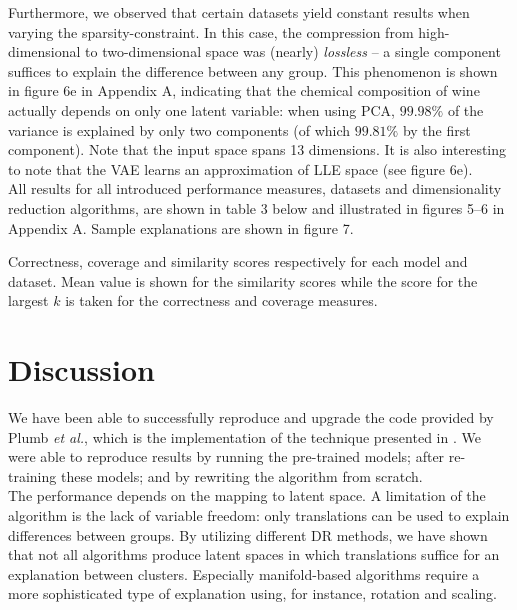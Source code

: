 Furthermore, we observed that certain datasets yield constant results when varying the sparsity-constraint. In this case, the compression from high-dimensional to two-dimensional space was (nearly) \textit{lossless} -- a single component suffices to explain the difference between any group. This phenomenon is shown in figure 6e in Appendix A, indicating that the chemical composition of wine actually depends on only one latent variable: when using PCA, $99.98\%$ of the variance is explained by only two components (of which $99.81\%$ by the first component). Note that the input space spans 13 dimensions. It is also interesting to note that the VAE learns an approximation of LLE space (see figure 6e).\\

All results for all introduced performance measures, datasets and dimensionality reduction algorithms, are shown in table 3 below and illustrated in figures 5--6 in Appendix A. Sample explanations are shown in figure 7.


\begin{table}[h]
  \begin{adjustwidth}{-3cm}{-3cm}
    \footnotesize
    \centering
    
  \end{adjustwidth}
  \caption{Correctness, coverage and similarity scores respectively for each model and dataset. Mean value is shown for the similarity scores while the score for the largest $k$ is taken for the correctness and coverage measures.}
\end{table}


\section{Discussion}
We have been able to successfully reproduce and upgrade the code provided by Plumb \textit{et al.}, which is the implementation of the technique presented in \citep{plumb2020explaining}. We were able to reproduce results by running the pre-trained models; after re-training these models; and by rewriting the algorithm from scratch.\\

The performance depends on the mapping to latent space. A limitation of the algorithm is the lack of variable freedom: only translations can be used to explain differences between groups. By utilizing different DR methods, we have shown that not all algorithms produce latent spaces in which translations suffice for an explanation between clusters. Especially manifold-based algorithms require a more sophisticated type of explanation using, for instance, rotation and scaling.\\


